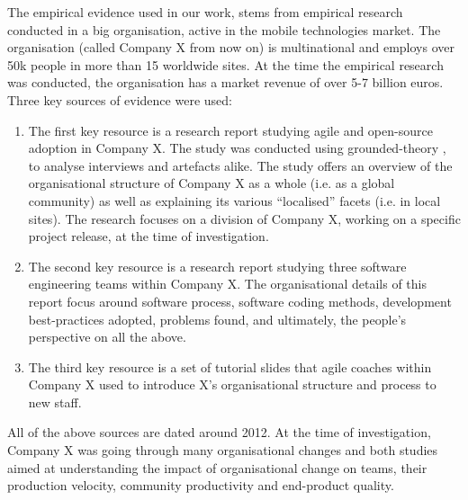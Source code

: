 \documentclass[conference]{IEEEtran}
\begin{document}
%
The empirical evidence used in our work, stems from empirical research conducted in a big organisation, active in the mobile technologies market. The organisation (called Company X from now on) is multinational and employs over 50k people in more than 15 worldwide sites. At the time the empirical research was conducted, the organisation has a market revenue of over 5-7 billion euros. Three key sources of evidence were used:
\begin{enumerate}
\item The first key resource is a research report studying agile and open-source adoption in Company X. The study was conducted using grounded-theory \cite{gt}, to analyse interviews and artefacts alike. The study offers an overview of the organisational structure of Company X as a whole (i.e. as a global community) as well as explaining its various ``localised'' facets (i.e. in local sites). The research focuses on a division of Company X, working on a specific project release, at the time of investigation.
\item The second key resource is a research report studying three software engineering teams within Company X. The organisational details of this report focus around software process, software coding methods, development best-practices adopted, problems found, and ultimately, the people's perspective on all the above.
\item The third key resource is a set of tutorial slides that agile coaches within Company X used to introduce X's organisational structure and process to new staff.
\end{enumerate}

All of the above sources are dated around 2012. At the time of investigation, Company X was going through many organisational changes and both studies aimed at understanding the impact of organisational change on teams, their production velocity, community productivity and end-product quality. 
\end{document}
